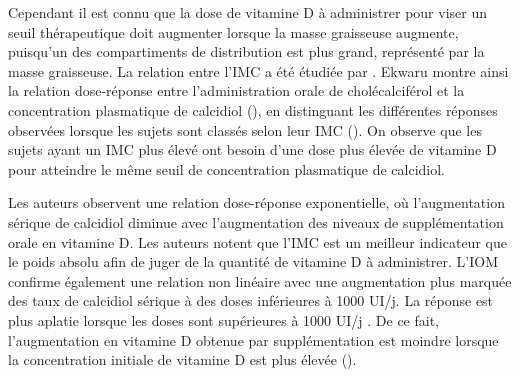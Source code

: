 \documentclass[
  a4paper,
  DIV=11,
  numbers=noendperiod,
  listof=totoc]{scrreprt}
\begin{document}
Cependant il est connu que la dose de vitamine D à administrer pour
viser un seuil thérapeutique doit augmenter lorsque la masse graisseuse
augmente, puisqu'un des compartiments de distribution est plus grand,
représenté par la masse graisseuse. La relation entre l'\ac{IMC} a été
étudiée par \textcite{Ekwaru.2014}. Ekwaru montre ainsi la relation
dose-réponse entre l'administration orale de cholécalciférol et la
concentration plasmatique de calcidiol (),
en distinguant les différentes réponses observées lorsque les sujets
sont classés selon leur \ac{IMC} (). On observe
que les sujets ayant un \ac{IMC} plus élevé ont besoin d'une dose plus
élevée de vitamine D pour atteindre le même seuil de concentration
plasmatique de calcidiol.

Les auteurs observent une relation dose-réponse exponentielle, où
l'augmentation sérique de calcidiol diminue avec l'augmentation des
niveaux de supplémentation orale en vitamine D. Les auteurs notent que
l'\ac{IMC} est un meilleur indicateur que le poids absolu afin de juger
de la quantité de vitamine D à administrer. L'\ac{IOM} confirme
également une relation non linéaire avec une augmentation plus marquée
des taux de calcidiol sérique à des doses inférieures à 1000 UI/j. La
réponse est plus aplatie lorsque les doses sont supérieures à 1000 UI/j
\autocite{IOM.2011,Garland.2011}. De ce fait, l'augmentation en vitamine
D obtenue par supplémentation est moindre lorsque la concentration
initiale de vitamine D est plus élevée ().
\end{document}
